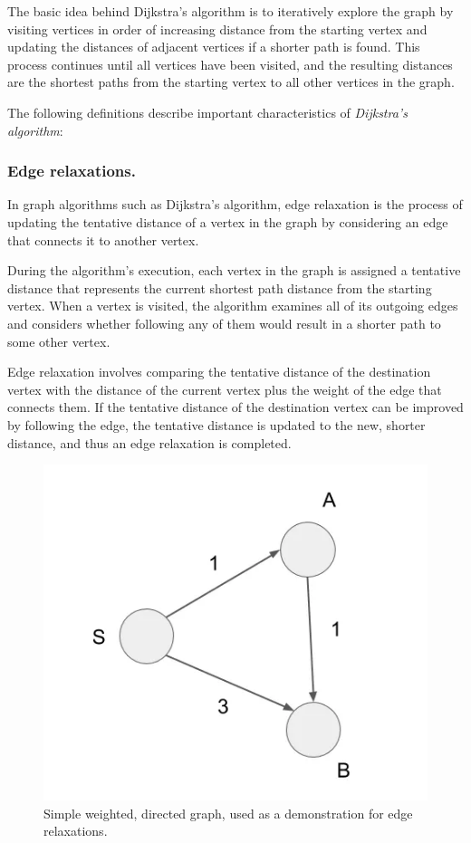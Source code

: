 \documentclass{l4proj}
\begin{document}
The basic idea behind Dijkstra's algorithm is to iteratively explore the graph by visiting vertices in order of increasing distance from the starting vertex and updating the distances of adjacent vertices if a shorter path is found. This process continues until all vertices have been visited, and the resulting distances are the shortest paths from the starting vertex to all other vertices in the graph.

The following definitions describe important characteristics of \emph{Dijkstra's algorithm}:
\subsubsection{Edge relaxations.}

In graph algorithms such as Dijkstra's algorithm, edge relaxation is the process of updating the tentative distance of a vertex in the graph by considering an edge that connects it to another vertex.

During the algorithm's execution, each vertex in the graph is assigned a tentative distance that represents the current shortest path distance from the starting vertex. When a vertex is visited, the algorithm examines all of its outgoing edges and considers whether following any of them would result in a shorter path to some other vertex.

Edge relaxation involves comparing the tentative distance of the destination vertex with the distance of the current vertex plus the weight of the edge that connects them. If the tentative distance of the destination vertex can be improved by following the edge, the tentative distance is updated to the new, shorter distance, and thus an edge relaxation is completed. 

\begin{figure}[!h]
    \centering
    \includegraphics[width=0.6\linewidth]{images/edge_relaxation.png}    
    \caption[Caption]{Simple weighted, directed graph, used as a demonstration for edge relaxations. \footnotemark}
    \label{fig:edge_r} 
\end{figure}
\end{document}
